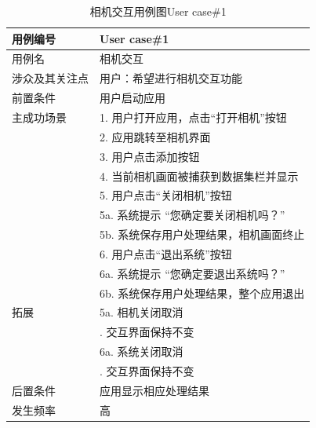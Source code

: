 \begin{table}
	\centering
	\small{}\setlength{}
	\caption{相机交互用例图User case\#1}
	\begin{tabular}{p{3.5cm}|p{8cm}}
		\hline
		用例编号 & User case\#1 \\
		\hline
		用例名 & 相机交互  \\
		\hline
		涉众及其关注点 & 用户：希望进行相机交互功能  \\
		\hline
		前置条件 & 用户启动应用 \\
		\hline
		主成功场景 & 1. 用户打开应用，点击“打开相机”按钮  \\
		& 2. 应用跳转至相机界面 \\
		& 3. 用户点击添加按钮 \\
		& 4.  当前相机画面被捕获到数据集栏并显示\\
		& 5.  用户点击“关闭相机”按钮\\
		&\quad 5a. 系统提示 “您确定要关闭相机吗？”  \\
		&\quad 5b. 系统保存用户处理结果，相机画面终止  \\
		& 6.  用户点击“退出系统”按钮\\
		&\quad 6a. 系统提示 “您确定要退出系统吗？”  \\
		&\quad 6b. 系统保存用户处理结果，整个应用退出  \\
		\hline
		拓展 & 5a. 相机关闭取消  \\	
		 & \quad 1. 交互界面保持不变  \\	
		     & 6a. 系统关闭取消  \\	
		& \quad 1. 交互界面保持不变  \\		
		\hline
		后置条件 & 应用显示相应处理结果 \\
		\hline
		发生频率 & 高 \\
		\hline
	\end{tabular}
	\label{tab:usercase1}
\end{table}

